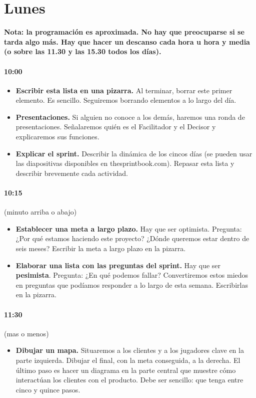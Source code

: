 \documentclass[10pt]{article}
\begin{document}
\section*{\center Lunes}
\begin{multicols}{2}
\textbf{Nota: la programación es aproximada. No hay que preocuparse si se tarda algo más. Hay que hacer un descanso cada hora u hora y media (o sobre las 11.30 y las 15.30 todos los días).}
\paragraph{10:00}
\begin{itemize}
\item \textbf{Escribir esta lista en una pizarra.} Al terminar, borrar este primer elemento. Es sencillo. Seguiremos borrando elementos a lo largo del día.
\item \textbf{Presentaciones.} Si alguien no conoce a los demás, haremos una ronda de presentaciones. Señalaremos quién es el Facilitador y el Decisor y explicaremos sus funciones.
\item \textbf{Explicar el sprint.} Describir la dinámica de los cincos días (se pueden usar las diapositivas disponibles en thesprintbook.com). Repasar esta lista y describir brevemente cada actividad.
\end{itemize}
\paragraph{10:15}(minuto arriba o abajo)
\begin{itemize}
\item \textbf{Establecer una meta a largo plazo.} Hay que ser optimista. Pregunta: ¿Por qué estamos haciendo este proyecto? ¿Dónde queremos estar dentro de seis meses? Escribir la meta a largo plazo en la pizarra.
\item \textbf{Elaborar una lista con las preguntas del sprint.} Hay que ser \textbf{pesimista}. Pregunta: ¿En qué podemos fallar? Convertiremos estos miedos en preguntas que podíamos responder a lo largo de esta semana. Escribirlas en la pizarra.
\end{itemize}
\paragraph{11:30}(mas o menos)
\begin{itemize}
\item \textbf{Dibujar un mapa.} Situaremos a los clientes y a los jugadores clave en la parte izquierda. Dibujar el final, con la meta conseguida, a la derecha. El último paso es hacer un diagrama en la parte central que muestre cómo interactúan los clientes con el producto. Debe ser sencillo: que tenga entre cinco y quince pasos.
\end{itemize}

\end{multicols}
\end{document}
